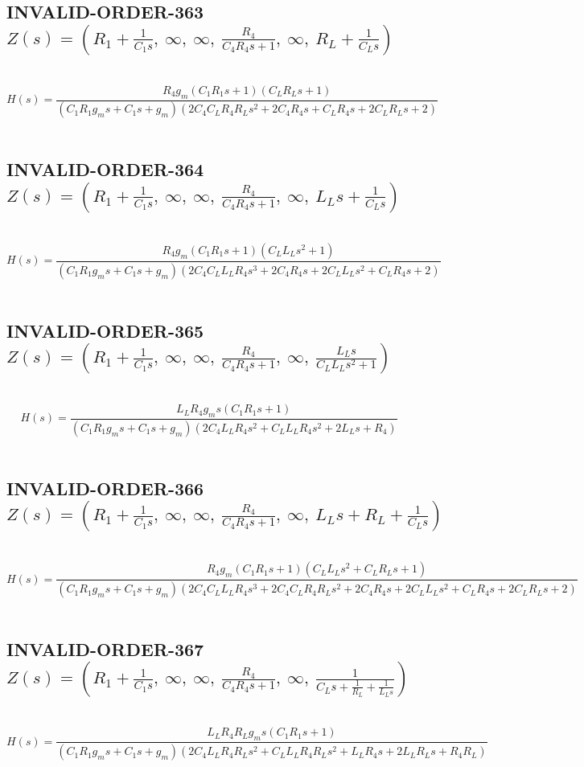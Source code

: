 \documentclass{article}
\begin{document}
\subsection{INVALID-ORDER-363 $Z(s) = \left( R_{1} + \frac{1}{C_{1} s}, \  \infty, \  \infty, \  \frac{R_{4}}{C_{4} R_{4} s + 1}, \  \infty, \  R_{L} + \frac{1}{C_{L} s}\right)$ } \ 
\textbf{\[H(s) = \frac{R_{4} g_{m} \left(C_{1} R_{1} s + 1\right) \left(C_{L} R_{L} s + 1\right)}{\left(C_{1} R_{1} g_{m} s + C_{1} s + g_{m}\right) \left(2 C_{4} C_{L} R_{4} R_{L} s^{2} + 2 C_{4} R_{4} s + C_{L} R_{4} s + 2 C_{L} R_{L} s + 2\right)}\] } \ 
\subsection{INVALID-ORDER-364 $Z(s) = \left( R_{1} + \frac{1}{C_{1} s}, \  \infty, \  \infty, \  \frac{R_{4}}{C_{4} R_{4} s + 1}, \  \infty, \  L_{L} s + \frac{1}{C_{L} s}\right)$ } \ 
\textbf{\[H(s) = \frac{R_{4} g_{m} \left(C_{1} R_{1} s + 1\right) \left(C_{L} L_{L} s^{2} + 1\right)}{\left(C_{1} R_{1} g_{m} s + C_{1} s + g_{m}\right) \left(2 C_{4} C_{L} L_{L} R_{4} s^{3} + 2 C_{4} R_{4} s + 2 C_{L} L_{L} s^{2} + C_{L} R_{4} s + 2\right)}\] } \ 
\subsection{INVALID-ORDER-365 $Z(s) = \left( R_{1} + \frac{1}{C_{1} s}, \  \infty, \  \infty, \  \frac{R_{4}}{C_{4} R_{4} s + 1}, \  \infty, \  \frac{L_{L} s}{C_{L} L_{L} s^{2} + 1}\right)$ } \ 
\textbf{\[H(s) = \frac{L_{L} R_{4} g_{m} s \left(C_{1} R_{1} s + 1\right)}{\left(C_{1} R_{1} g_{m} s + C_{1} s + g_{m}\right) \left(2 C_{4} L_{L} R_{4} s^{2} + C_{L} L_{L} R_{4} s^{2} + 2 L_{L} s + R_{4}\right)}\] } \ 
\subsection{INVALID-ORDER-366 $Z(s) = \left( R_{1} + \frac{1}{C_{1} s}, \  \infty, \  \infty, \  \frac{R_{4}}{C_{4} R_{4} s + 1}, \  \infty, \  L_{L} s + R_{L} + \frac{1}{C_{L} s}\right)$ } \ 
\textbf{\[H(s) = \frac{R_{4} g_{m} \left(C_{1} R_{1} s + 1\right) \left(C_{L} L_{L} s^{2} + C_{L} R_{L} s + 1\right)}{\left(C_{1} R_{1} g_{m} s + C_{1} s + g_{m}\right) \left(2 C_{4} C_{L} L_{L} R_{4} s^{3} + 2 C_{4} C_{L} R_{4} R_{L} s^{2} + 2 C_{4} R_{4} s + 2 C_{L} L_{L} s^{2} + C_{L} R_{4} s + 2 C_{L} R_{L} s + 2\right)}\] } \ 
\subsection{INVALID-ORDER-367 $Z(s) = \left( R_{1} + \frac{1}{C_{1} s}, \  \infty, \  \infty, \  \frac{R_{4}}{C_{4} R_{4} s + 1}, \  \infty, \  \frac{1}{C_{L} s + \frac{1}{R_{L}} + \frac{1}{L_{L} s}}\right)$ } \ 
\textbf{\[H(s) = \frac{L_{L} R_{4} R_{L} g_{m} s \left(C_{1} R_{1} s + 1\right)}{\left(C_{1} R_{1} g_{m} s + C_{1} s + g_{m}\right) \left(2 C_{4} L_{L} R_{4} R_{L} s^{2} + C_{L} L_{L} R_{4} R_{L} s^{2} + L_{L} R_{4} s + 2 L_{L} R_{L} s + R_{4} R_{L}\right)}\] } \ 
\end{document}
